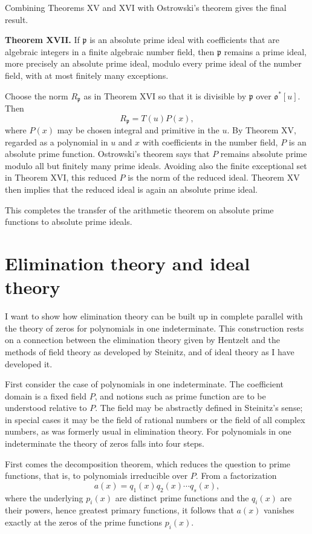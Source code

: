 \documentclass[11pt]{article}
\begin{document}
Combining Theorems XV and XVI with Ostrowski's theorem gives the final result.

\textbf{Theorem XVII.} If $\mathfrak p$ is an absolute prime ideal with coefficients that are algebraic integers in a finite algebraic number field, then $\mathfrak p$ remains a prime ideal, more precisely an absolute prime ideal, modulo every prime ideal of the number field, with at most finitely many exceptions.

Choose the norm $R_{\mathfrak p}$ as in Theorem XVI so that it is divisible by $\mathfrak p$ over $\mathfrak o^*[u]$. Then
\[
  R_{\mathfrak p}=T(u)P(x),
\]
where $P(x)$ may be chosen integral and primitive in the $u$. By Theorem XV, regarded as a polynomial in $u$ and $x$ with coefficients in the number field, $P$ is an absolute prime function. Ostrowski's theorem says that $P$ remains absolute prime modulo all but finitely many prime ideals. Avoiding also the finite exceptional set in Theorem XVI, this reduced $P$ is the norm of the reduced ideal. Theorem XV then implies that the reduced ideal is again an absolute prime ideal.

This completes the transfer of the arithmetic theorem on absolute prime functions to absolute prime ideals.

\newpage

\section{Elimination theory and ideal theory}

I want to show how elimination theory can be built up in complete parallel with the theory of zeros for polynomials in one indeterminate. This construction rests on a connection between the elimination theory given by Hentzelt and the methods of field theory as developed by Steinitz, and of ideal theory as I have developed it.

First consider the case of polynomials in one indeterminate. The coefficient domain is a fixed field $P$, and notions such as prime function are to be understood relative to $P$. The field may be abstractly defined in Steinitz's sense; in special cases it may be the field of rational numbers or the field of all complex numbers, as was formerly usual in elimination theory. For polynomials in one indeterminate the theory of zeros falls into four steps.

First comes the decomposition theorem, which reduces the question to prime functions, that is, to polynomials irreducible over $P$. From a factorization
\[
  a(x)=q_1(x)q_2(x)\cdots q_s(x),
\]
where the underlying $p_i(x)$ are distinct prime functions and the $q_i(x)$ are their powers, hence greatest primary functions, it follows that $a(x)$ vanishes exactly at the zeros of the prime functions $p_i(x)$.
\end{document}
